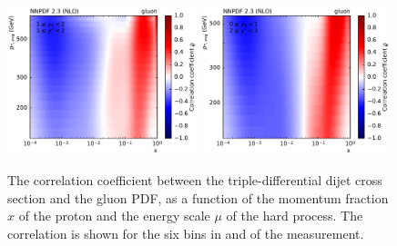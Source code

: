 \begin{figure}[h!tbp]
    \includegraphics[width=0.49\textwidth]{figures/pdf_constraints/corr_PTMAXEXPYS_YBYS_NLO_FINALBINS_NNPDF23_gluon_ys1_0yb1_0_cl.pdf}\hfill
    \includegraphics[width=0.49\textwidth]{figures/pdf_constraints/corr_PTMAXEXPYS_YBYS_NLO_FINALBINS_NNPDF23_gluon_ys2_0yb0_0_cl.pdf}\hfill
    \caption[Correlation between dijet cross section and gluon PDF]{
            The correlation coefficient between the triple-differential dijet cross
            section and the gluon PDF, as a function of the momentum fraction $x$ of the
            proton and the energy scale $\mu$ of the hard process. The correlation is shown
            for the six bins in \ystar and \yboost of the measurement.}
    \label{fig:pdfconstraints_gluon}
\end{figure}

